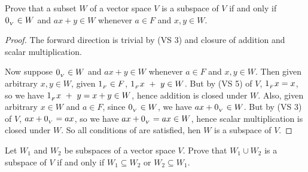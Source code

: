 \begin{exercise} \label{exercise 1.3.18}
Prove that a subset \(W\) of a vector space \(V\) is a subspace of \(V\) if and only if \(0_{_V} \in W\) and \(a x + y \in W\) whenever \(a \in F\) and \(x, y \in W\).
\end{exercise}

\begin{proof}
The forward direction is trivial by  (VS 3) and closure of addition and scalar multiplication.

Now suppose \(0_{_V} \in W\) and \(a x + y \in W\) whenever \(a \in F\) and \(x, y \in W\).
Then given arbitrary \(x, y \in W\), given \(1_{_F} \in F\), \(1_{_F} x\ +\ y \in W\).
But by (VS 5) of \(V\), \(1_{_F} x = x\), so we have \(1_{_F} x\ +\ y = x + y \in W\), hence addition is closed under \(W\).
Also, given arbitrary \(x \in W\) and \(a \in F\), since \(0_{_V} \in W\), we have \(ax + 0_{_V} \in W\).
But by (VS 3) of \(V\), \(ax + 0_{_V} = ax\), so we have \(ax + 0_{_V} = ax \in W\), hence scalar multiplication is closed under \(W\).
So all conditions of  are satisfied, hen \(W\) is a subspace of \(V\).
\end{proof}

\begin{exercise} \label{exercise 1.3.19}
Let \(W_1\) and \(W_2\) be subspaces of a vector space \(V\).
Prove that \(W_1 \cup W_2\) is a subspace of \(V\) if and only if \(W_1 \subseteq W_2\) or \(W_2 \subseteq W_1\).
\end{exercise}

